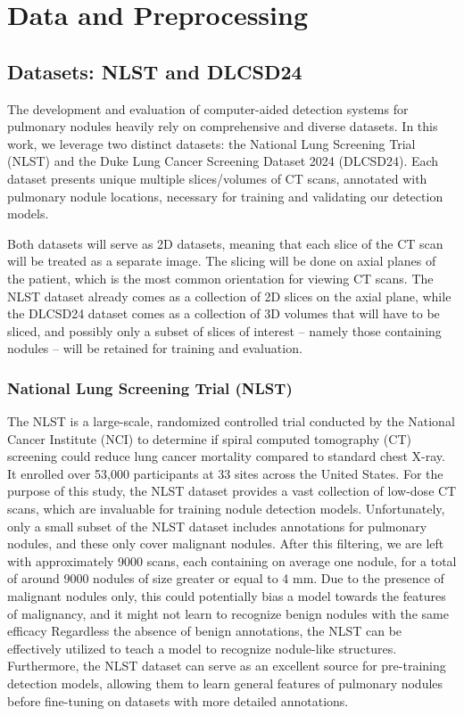 \chapter{Data and Preprocessing}
\label{chap:data-and-preprocessing}
\section{Datasets: NLST and DLCSD24}
The development and evaluation of computer-aided detection systems for pulmonary nodules heavily rely on comprehensive and diverse datasets. In this work, we leverage two distinct datasets: the National Lung Screening Trial (NLST) and the Duke Lung Cancer Screening Dataset 2024 (DLCSD24). Each dataset presents unique multiple slices/volumes of CT scans, annotated with pulmonary nodule locations, necessary for training and validating our detection models.

Both datasets will serve as 2D datasets, meaning that each slice of the CT scan will be treated as a separate image. The slicing will be done on axial planes of the patient, which is the most common orientation for viewing CT scans.
The NLST dataset already comes as a collection of 2D slices on the axial plane, while the DLCSD24 dataset comes as a collection of 3D volumes that will have to be sliced, and possibly only a subset of slices of interest -- namely those containing nodules -- will be retained for training and evaluation.

\subsection{National Lung Screening Trial (NLST)}
The NLST is a large-scale, randomized controlled trial conducted by the National Cancer Institute (NCI) to determine if spiral computed tomography (CT) screening could reduce lung cancer mortality compared to standard chest X-ray. It enrolled over 53,000 participants at 33 sites across the United States. For the purpose of this study, the NLST dataset provides a vast collection of low-dose CT scans, which are invaluable for training nodule detection models.
Unfortunately, only a small subset of the NLST dataset includes annotations for pulmonary nodules, and these only cover malignant nodules.
After this filtering, we are left with approximately 9000 scans, each containing on average one nodule, for a total of around 9000 nodules of size greater or equal to 4 mm.
Due to the presence of malignant nodules only, this could potentially bias a model towards the features of malignancy, and it might not learn to recognize benign nodules with the same efficacy 
Regardless the absence of benign annotations, the NLST can be effectively utilized to teach a model to recognize nodule-like structures. Furthermore, the NLST dataset can serve as an excellent source for pre-training detection models, allowing them to learn general features of pulmonary nodules before fine-tuning on datasets with more detailed annotations.


